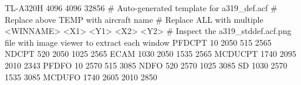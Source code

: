 TL-A320H 4096 4096 32856
# Auto-generated template for a319_def.acf
# Replace above TEMP with aircraft name
# Replace ALL with multiple <WINNAME> <X1> <Y1> <X2> <Y2>
# Inspect the a319_stddef.acf.png file with image viewer to extract each window
PFDCPT            10     2050   515  	2565
NDCPT		 520	 2050	1025	2565
ECAM		1030	 2050	1535	2565
MCDUCPT		1740	 2095	2010	2343
PFDFO		  10	 2570	515	3085
NDFO		 520	 2570   1025    3085
SD              1030     2570   1535    3085
MCDUFO          1740     2605	2010    2850